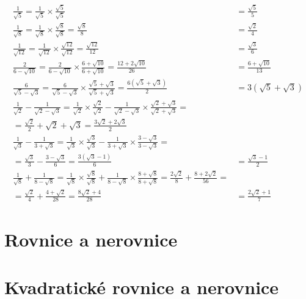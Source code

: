 \documentclass[a4paper,12pt]{article}
\begin{document}
\begin{align*}
\frac{1}{\sqrt{5}}
= \frac{1}{\sqrt{5}} \times \frac{\sqrt{5}}{\sqrt{5}}
&= \frac{\sqrt{5}}{5} \\[6pt]
\frac{1}{\sqrt{8}}
= \frac{1}{\sqrt{8}} \times \frac{\sqrt{8}}{\sqrt{8}}
= \frac{\sqrt{8}}{8}
&= \frac{\sqrt{2}}{4} \\[6pt]
\frac{1}{\sqrt{12}}
= \frac{1}{\sqrt{12}} \times \frac{\sqrt{12}}{\sqrt{12}}
= \frac{\sqrt{12}}{12}
&= \frac{\sqrt{3}}{6} \\[6pt]
\frac{2}{6 - \sqrt{10}}
= \frac{2}{6 - \sqrt{10}} \times \frac{6 + \sqrt{10}}{6 + \sqrt{10}}
= \frac{12 + 2\sqrt{10}}{26}
&= \frac{6 + \sqrt{10}}{13} \\[6pt]
\frac{6}{\sqrt{5} - \sqrt{3}}
= \frac{6}{\sqrt{5} - \sqrt{3}} \times \frac{\sqrt{5} + \sqrt{3}}{\sqrt{5} + \sqrt{3}}
= \frac{6(\sqrt{5} + \sqrt{3})}{2}
&= 3(\sqrt{5} + \sqrt{3}) \\[6pt]
\frac{1}{\sqrt{2}} - \frac{1}{\sqrt{2} - \sqrt{3}}
= \frac{1}{\sqrt{2}} \times \frac{\sqrt{2}}{\sqrt{2}} - \frac{1}{\sqrt{2} - \sqrt{3}} \times \frac{\sqrt{2} + \sqrt{3}}{\sqrt{2} + \sqrt{3}}= \\[6pt]
= \frac{\sqrt{2}}{2} + \sqrt{2} + \sqrt{3}
= \frac{3\sqrt{2} + 2\sqrt{3}}{2} \\[6pt]
\frac{1}{\sqrt{3}} - \frac{1}{3 + \sqrt{3}}
= \frac{1}{\sqrt{3}} \times \frac{\sqrt{3}}{\sqrt{3}} - \frac{1}{3 + \sqrt{3}} \times \frac{3 - \sqrt{3}}{3 - \sqrt{3}}= \\[6pt]
= \frac{\sqrt{3}}{3} - \frac{3 - \sqrt{3}}{6}
= \frac{3(\sqrt{3} - 1)}{6}
&= \frac{\sqrt{3} - 1}{2} \\[6pt]
\frac{1}{\sqrt{8}} + \frac{1}{8 - \sqrt{8}}
= \frac{1}{\sqrt{8}} \times \frac{\sqrt{8}}{\sqrt{8}} + \frac{1}{8 - \sqrt{8}} \times \frac{8 + \sqrt{8}}{8 + \sqrt{8}}
= \frac{2\sqrt{2}}{8} + \frac{8 + 2\sqrt{2}}{56}= \\[6pt]
= \frac{\sqrt{2}}{4} + \frac{4 + \sqrt{2}}{28}
= \frac{8\sqrt{2} + 4}{28}
&= \frac{2\sqrt{2} + 1}{7}
\end{align*}

\section{Rovnice a nerovnice}

\section{Kvadratické rovnice a nerovnice}
\end{document}
